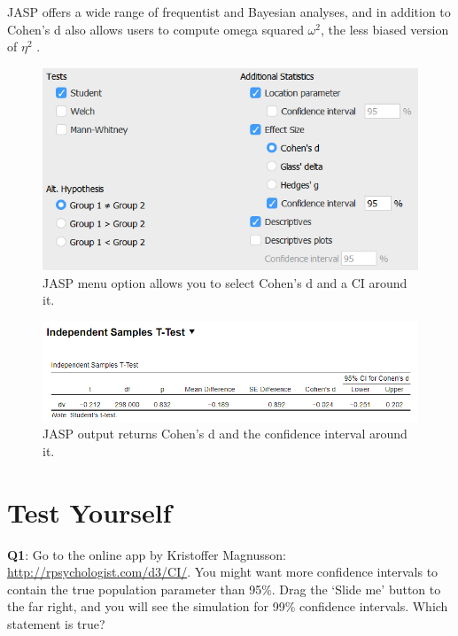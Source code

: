 \documentclass[
]{krantz}
\begin{document}
JASP offers a wide range of frequentist and Bayesian analyses, and in addition to Cohen's d also allows users to compute omega squared \(\omega^{2}\), the less biased version of \(\eta^{2}\) \citep{okada_is_2013, albers_when_2018}.

\begin{figure}

{\centering \includegraphics[width=1\linewidth]{images/jaspeffectci1} 

}

\caption{JASP menu option allows you to select Cohen's d and a CI around it.}\label{fig:jasp1}
\end{figure}

\begin{figure}

{\centering \includegraphics[width=1\linewidth]{images/jaspeffectci2} 

}

\caption{JASP output returns Cohen's d and the confidence interval around it.}\label{fig:jasp2}
\end{figure}

\hypertarget{test-yourself-5}{%
\section{Test Yourself}\label{test-yourself-5}}

\textbf{Q1}: Go to the online app by Kristoffer Magnusson:
\url{http://rpsychologist.com/d3/CI/}. You might want more confidence intervals to contain the true population parameter than 95\%. Drag the `Slide me' button to the far right, and you will see the simulation for 99\% confidence intervals. Which statement is true?
\end{document}
